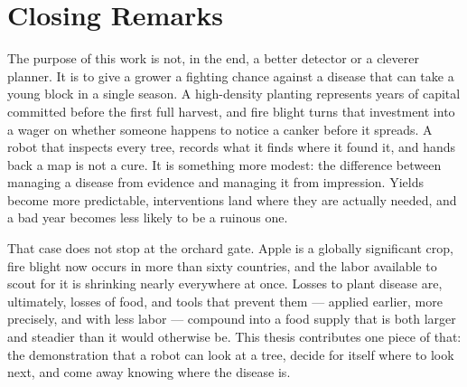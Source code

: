 \section{Closing Remarks} \label{secClosingRemarks}

The purpose of this work is not, in the end, a better detector or a
cleverer planner.
It is to give a grower a fighting chance against a disease that can take a
young block in a single season.
A high-density planting represents years of capital committed before the
first full harvest, and fire blight turns that investment into a wager on
whether someone happens to notice a canker before it spreads.
A robot that inspects every tree, records what it finds where it found it,
and hands back a map is not a cure.
It is something more modest: the difference between managing a disease
from evidence and managing it from impression.
Yields become more predictable, interventions land where they are
actually needed, and a bad year becomes less likely to be a ruinous one.

That case does not stop at the orchard gate.
Apple is a globally significant crop, fire blight now occurs in more than
sixty countries, and the labor available to scout for it is shrinking
nearly everywhere at once.
Losses to plant disease are, ultimately, losses of food, and tools that
prevent them --- applied earlier, more precisely, and with less labor ---
compound into a food supply that is both larger and steadier than
it would otherwise be.
This thesis contributes one piece of that: the demonstration that a robot
can look at a tree, decide for itself where to look next, and come away
knowing where the disease is.
